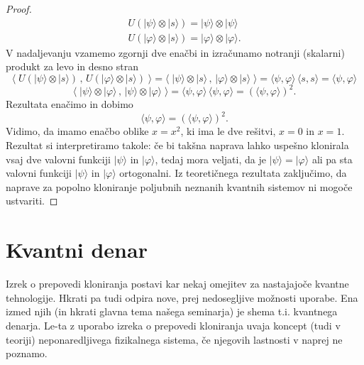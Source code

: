 \documentclass[12pt]{article}
\begin{document}
\begin{proof}
\begin{equation}
\begin{split}
U(| \psi \rangle \otimes | s \rangle) = | \psi \rangle \otimes | \psi \rangle
\\U(| \varphi \rangle \otimes | s \rangle) = | \varphi \rangle \otimes | \varphi \rangle.
\end{split}
\end{equation}
V nadaljevanju vzamemo zgornji dve enačbi in izračunamo notranji (skalarni) produkt za levo in desno stran
\begin{equation}
\langle \; U(| \psi \rangle \otimes | s \rangle) \, , \, U(| \varphi \rangle \otimes | s \rangle) \; \rangle = \langle \; | \psi \rangle \otimes | s \rangle \, , \, | \varphi \rangle \otimes | s \rangle \; \rangle = \langle \psi, \varphi \rangle \, \langle s, s \rangle = \langle \psi, \varphi \rangle
\end{equation}
\begin{equation}
\langle \; | \psi \rangle \otimes | \varphi \rangle \, , \, | \psi \rangle \otimes | \varphi \rangle \; \rangle = \langle \psi, \varphi \rangle \, \langle \psi, \varphi \rangle = \left( \langle \psi, \varphi \rangle \right)^2.
\end{equation}
Rezultata enačimo in dobimo
\begin{equation}
 \langle \psi, \varphi \rangle = \left( \langle \psi, \varphi \rangle \right)^2.
\end{equation}
Vidimo, da imamo enačbo oblike $x = x^2$, ki ima le dve rešitvi, $x = 0$ in $x = 1$. Rezultat si interpretiramo takole: če bi takšna naprava lahko uspešno klonirala vsaj dve valovni funkciji $| \psi \rangle$ in $| \varphi \rangle$, tedaj mora veljati, da je $ | \psi \rangle = | \varphi \rangle$ ali pa sta valovni funkciji $| \psi \rangle$ in $| \varphi \rangle$ ortogonalni. Iz teoretičnega rezultata zaključimo, da naprave za popolno kloniranje poljubnih neznanih kvantnih sistemov ni mogoče ustvariti.
\end{proof}
 
\section{Kvantni denar} 

Izrek o prepovedi kloniranja postavi kar nekaj omejitev za nastajajoče kvantne tehnologije. Hkrati pa tudi odpira nove, prej nedosegljive možnosti uporabe. Ena izmed njih (in hkrati glavna tema našega seminarja) je shema t.i. kvantnega denarja. Le-ta z uporabo izreka o prepovedi kloniranja uvaja koncept (tudi v teoriji) neponaredljivega fizikalnega sistema, če njegovih lastnosti v naprej ne poznamo.
\end{document}
